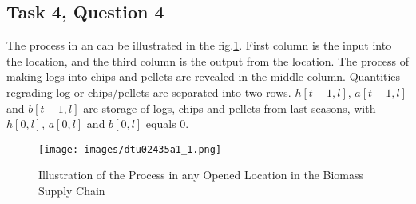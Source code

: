 \documentclass[fleqn,10pt]{wlscirep}
\begin{document}
\subsection{Task 4, Question 4}

The process in an  can be illustrated in the fig.\ref{fig:dtu02435a1_1}. First column is the input into the location, and the third column is the output from the location. The process of making logs into chips and pellets are revealed in the middle column. Quantities regrading log or chips/pellets are separated into two rows. $h[t-1, l]$, $a[t-1, l]$ and $b[t-1, l]$ are storage of logs, chips and pellets from last seasons, with $h[0, l]$, $a[0, l]$ and $b[0, l]$ equals 0.

\begin{figure}[ht]
    \centering
    \texttt{[image: images/dtu02435a1\_1.png]}
    \caption{Illustration of the Process in any Opened Location in the  Biomass Supply Chain}
    \label{fig:dtu02435a1_1}
\end{figure}
\FloatBarrier
\end{document}

